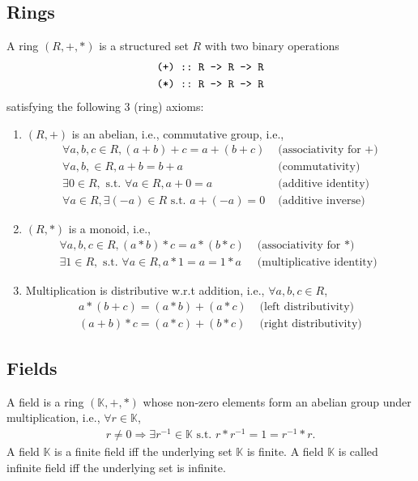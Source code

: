 \documentclass[11pt]{book}
\begin{document}
\subsection{Rings}
A ring $(R,+,*)$ is a structured set $R$ with two binary operations
\begin{eqnarray}
\verb|(+) :: R -> R -> R|\\
\verb|(*) :: R -> R -> R|
\end{eqnarray}
satisfying the following 3 (ring) axioms:
\begin{enumerate}
\item $(R,+)$ is an abelian, i.e., commutative group,
i.e.,
\begin{eqnarray}
\forall a,b,c \in R, (a+b) + c = a + (b + c) & \text{ (associativity for $+$)} \\
\forall a, b, \in R, a+b = b+a & \text{ (commutativity)} \\
\exists 0 \in R, \text{ s.t. } \forall a \in R, a + 0 = a & \text{ (additive identity) } \\
\forall a \in R, \exists (-a) \in R \text{ s.t. } a + (-a) = 0 & \text{ (additive inverse)}
\end{eqnarray}

\item $(R,*)$ is a monoid, i.e.,
\begin{eqnarray}
\forall a,b,c \in R, (a*b) * c = a * (b * c) & \text{ (associativity for $*$)} \\
\exists 1 \in R, \text{ s.t. } \forall a \in R, a * 1 = a = 1*a & \text{ (multiplicative identity) } 
\end{eqnarray}

\item Multiplication is distributive w.r.t addition, i.e., $\forall a,b,c \in R$, 
\begin{eqnarray}
a*(b+c) = (a*b) + (a*c) & \text{ (left distributivity)} \\
(a+b)*c = (a*c) + (b*c) & \text{ (right distributivity)} 
\end{eqnarray}

\end{enumerate}

\subsection{Fields}
A field is a ring $(\mathbb{K},+,*)$ whose non-zero elements form an abelian group under multiplication, i.e., $\forall r \in \mathbb{K}$,
\begin{eqnarray}
r \neq 0 \Rightarrow \exists r^{-1} \in \mathbb{K} \text{ s.t. } r*r^{-1} = 1 = r^{-1}*r.
\end{eqnarray}
A field $\mathbb{K}$ is a finite field iff the underlying set $\mathbb{K}$ is finite.
A field $\mathbb{K}$ is called infinite field iff the underlying set is infinite.
\end{document}
